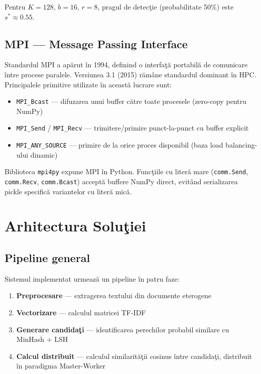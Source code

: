\documentclass[a4paper,12pt]{report}
\begin{document}
Pentru $K=128$, $b=16$, $r=8$, pragul de detec\c{t}ie (probabilitate 50\%) este $s^* \approx 0.55$.

\section{MPI — Message Passing Interface}

Standardul \ac{MPI} a ap\u{a}rut \^{i}n 1994, definind o interfa\c{t}\u{a} portabil\u{a} de comunicare \^{i}ntre procese paralele. Versiunea 3.1 (2015) r\u{a}m\^{a}ne standardul dominant \^{i}n \ac{HPC}. Principalele primitive utilizate \^{i}n aceast\u{a} lucrare sunt:
\begin{itemize}
  \item \texttt{MPI\_Bcast} — difuzarea unui buffer c\u{a}tre toate procesele (zero-copy pentru NumPy)
  \item \texttt{MPI\_Send} / \texttt{MPI\_Recv} — trimitere/primire punct-la-punct cu buffer explicit
  \item \texttt{MPI\_ANY\_SOURCE} — primire de la orice proces disponibil (baza load balancing-ului dinamic)
\end{itemize}

Biblioteca \texttt{mpi4py} \cite{dalcin2011} expune \ac{MPI} \^{i}n Python. Func\c{t}iile cu liter\u{a} mare (\texttt{comm.Send}, \texttt{comm.Recv}, \texttt{comm.Bcast}) accept\u{a} buffere NumPy direct, evit\^{a}nd serializarea pickle specific\u{a} variantelor cu liter\u{a} mic\u{a}.

\chapter{Arhitectura Solu\c{t}iei}

\section{Pipeline general}

Sistemul implementat urmeaz\u{a} un pipeline \^{i}n patru faze:

\begin{enumerate}
  \item \textbf{Preprocesare} — extragerea textului din documente eterogene
  \item \textbf{Vectorizare} — calculul matricei TF-IDF
  \item \textbf{Generare candida\c{t}i} — identificarea perechilor probabil similare cu MinHash + LSH
  \item \textbf{Calcul distribuit} — calculul similarit\u{a}\c{t}ii cosinus \^{i}ntre candida\c{t}i, distribuit \^{i}n paradigma Master-Worker
\end{enumerate}
\end{document}
